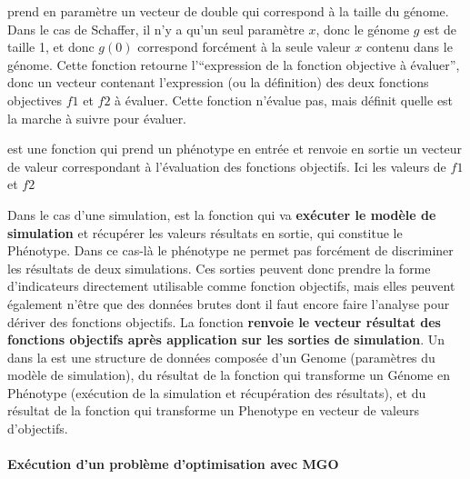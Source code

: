 \begin{itemize}[label=\textbullet, noitemsep, topsep=0pt, parsep=0pt, partopsep=0pt]
 prend en paramètre un vecteur de double qui correspond à la taille du génome. Dans le cas de Schaffer, il n'y a qu'un seul paramètre $x$, donc le génome $g$ est de taille 1, et donc $g(0)$ correspond forcément à la seule valeur $x$ contenu dans le génome. Cette fonction retourne l'\enquote{expression de la fonction objective à évaluer}, donc un vecteur contenant l'expression (ou la définition) des deux fonctions objectives $f1$ et $f2$ à évaluer. Cette fonction n'évalue pas, mais définit quelle est la marche à suivre pour évaluer.

 est une fonction qui prend un phénotype en entrée et renvoie en sortie un vecteur de valeur correspondant à l'évaluation des fonctions objectifs. Ici les valeurs de $f1$ et $f2$

\end{itemize}

Dans le cas d'une simulation,  est la fonction qui va \textbf{exécuter le modèle de simulation} et récupérer les valeurs résultats en sortie, qui constitue le Phénotype. Dans ce cas-là le phénotype ne permet pas forcément de discriminer les résultats de deux simulations. Ces sorties peuvent donc prendre la forme d'indicateurs directement utilisable comme fonction objectifs, mais elles peuvent également n'être que des données brutes dont il faut encore faire l'analyse pour dériver des fonctions objectifs. La fonction  \textbf{renvoie le vecteur résultat des fonctions objectifs après application sur les sorties de simulation}. Un  dans la  est une structure de données composée d'un Genome (paramètres du modèle de simulation), du résultat de la fonction  qui transforme un Génome en Phénotype (exécution de la simulation et récupération des résultats), et du résultat de la fonction  qui transforme un Phenotype en vecteur de valeurs d'objectifs.


\paragraph{Exécution d'un problème d'optimisation avec MGO}


